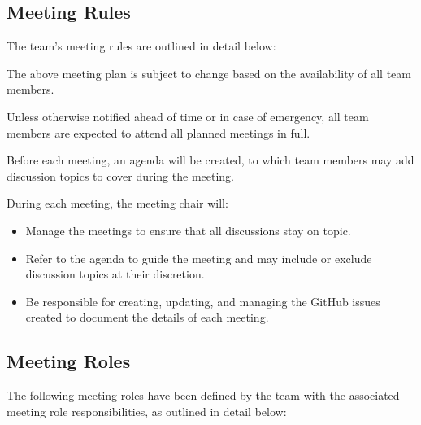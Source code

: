 \documentclass{article}
\begin{document}
\subsection{Meeting Rules}

The team's meeting rules are outlined in detail below:

\begin{itemize}
\begin{item}
The above meeting plan is subject to change based on the availability of all team members.
\end{item}
\begin{item}
Unless otherwise notified ahead of time or in case of emergency, all team members are expected to attend all planned meetings in full.
\end{item}
\begin{item}  
Before each meeting, an agenda will be created, to which team members may add discussion topics to cover during the meeting.
\end{item}
\begin{item}
During each meeting, the meeting chair will:
\begin{itemize}
\item Manage the meetings to ensure that all discussions stay on topic.  
\item Refer to the agenda to guide the meeting and may include or exclude discussion topics at their discretion.  
\item Be responsible for creating, updating, and managing the GitHub issues created to document the details of each meeting.
\end{itemize}
\end{item}
\end{itemize}

\subsection{Meeting Roles}

The following meeting roles have been defined by the team with the associated meeting role responsibilities, as outlined in detail below:
\end{document}
